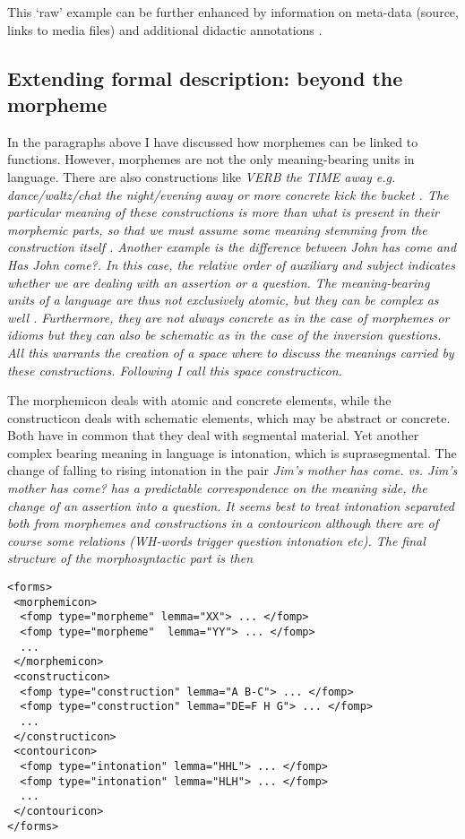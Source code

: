 This `raw' example can be further enhanced by information on meta-data (source, links to media files) and additional didactic annotations \citep[constituency, highlighting of important aspects][]{Good2004}.


\subsection{Extending formal description: beyond the morpheme}
In the paragraphs above I have discussed how morphemes can be linked to functions. However, morphemes are not the only meaning-bearing units in language. There are also constructions like \em VERB the TIME away \em e.g. \em dance/waltz/chat the night/evening away \em or more concrete \em kick the bucket \em \citep{CulicoverEtAl2005}. The particular meaning of these constructions is more than what is present in their morphemic parts, so that we must assume some meaning stemming from the construction itself \citep{FillmoreEtAl1993CxG,Goldberg1995CxG,Croft2001rcg}. Another example is the difference between \em John has come \em and \em Has John come?\em. In this case, the relative order of auxiliary and subject indicates whether we are dealing with an assertion or a question. The meaning-bearing units of a language are thus not exclusively atomic, but they can be complex as well \citep{Lehmann1993}. Furthermore, they are not always concrete as in the case of morphemes or idioms but they can also be schematic as in the case of the inversion questions. All this warrants the creation of a space where to discuss the meanings carried by these constructions. Following \citet{Goldberg1995CxG} I call this space \em constructicon\em.

The morphemicon deals with atomic and concrete elements, while the constructicon deals with schematic elements, which may be abstract or concrete. Both have in common that they deal with segmental material. Yet another complex bearing meaning in language is intonation, which is suprasegmental. The change of falling to rising intonation in the pair \em Jim's mother has come. \em vs. \em Jim's mother has come? \em has a predictable 	correspondence on the meaning side, the change of an assertion into a question. It seems best to treat intonation separated both from morphemes and constructions in a \em contouricon \em although there are of course some relations (WH-words trigger question intonation etc). The final structure of the morphosyntactic part is then

\ea\label{xml:semasiology}
\begin{verbatim} 
<forms>
 <morphemicon>
  <fomp type="morpheme" lemma="XX"> ... </fomp>
  <fomp type="morpheme"  lemma="YY"> ... </fomp>
  ...
 </morphemicon>
 <constructicon>
  <fomp type="construction" lemma="A B-C"> ... </fomp>
  <fomp type="construction" lemma="DE=F H G"> ... </fomp>
  ...
 </constructicon>
 <contouricon>
  <fomp type="intonation" lemma="HHL"> ... </fomp>
  <fomp type="intonation" lemma="HLH"> ... </fomp>
  ...
 </contouricon>
</forms>
\end{verbatim} 
\z

